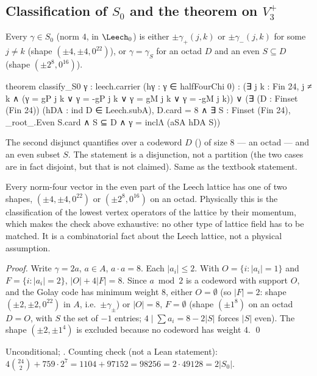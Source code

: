 \subsection{\texorpdfstring{Classification of $S_0$ and the theorem on $V_3^+$}{Classification of S0 and the theorem on V3+}}
\begin{theorem}\label{ch13:thm:classify}
Every $\gamma\in S_0$ (norm $4$, in $\Leech_0$) is either $\pm\gamma_+(j,k)$ or $\pm\gamma_-(j,k)$ for some $j\ne k$ (shape
$(\pm4,\pm4,0^{22})$), or $\gamma=\gamma_S$ for an octad $D$ and an even $S\subseteq D$ (shape $(\pm2^8,0^{16})$).
\end{theorem}
\begin{leancode}
theorem classify_S0 {γ : leech.carrier} (hγ : γ ∈ halfFourChi 0) :
    (∃ j k : Fin 24, j ≠ k ∧ (γ = gP j k ∨ γ = -gP j k ∨ γ = gM j k ∨ γ = -gM j k)) ∨
    (∃ (D : Finset (Fin 24)) (hDA : ind D ∈ Leech.subA), D.card = 8 ∧
      ∃ S : Finset (Fin 24), _root_.Even S.card ∧ S ⊆ D ∧ γ = inclΛ (aSA hDA S))
\end{leancode}
\begin{dictionary}
The second disjunct quantifies over a codeword $D$ () of size $8$ --- an octad
--- and an even subset $S$. The statement is a disjunction, not a partition (the two cases are in fact
disjoint, but that is not claimed). Same as the textbook statement.
\end{dictionary}
\begin{physics}
Every norm-four vector in the even part of the Leech lattice has one of two shapes, $(\pm4,\pm4,0^{22})$ or $(\pm2^8,0^{16})$ on an octad. Physically this is the classification of the lowest vertex operators of the lattice by their momentum, which makes the check above exhaustive: no other type of lattice field has to be matched. It is a combinatorial fact about the Leech lattice, not a physical assumption.
\end{physics}
\noindent\emph{Proof.} Write $\gamma=2a$, $a\in A$, $a\cdot a=8$. Each $|a_i|\le2$. With $O=\{i:|a_i|=1\}$ and
$F=\{i:|a_i|=2\}$, $|O|+4|F|=8$. Since $a\bmod2$ is a codeword with support $O$, and the Golay code has
minimum weight $8$, either $O=\emptyset$ (so $|F|=2$: shape $(\pm2,\pm2,0^{22})$ in $A$, i.e.\ $\pm\gamma_\pm$) or
$|O|=8$, $F=\emptyset$ (shape $(\pm1^8)$ on an octad $D=O$, with $S$ the set of $-1$ entries; $4\mid\sum a_i=8-2|S|$
forces $|S|$ even). The shape $(\pm2,\pm1^4)$ is excluded because no codeword has weight $4$. \qed
\begin{status}Unconditional; . Counting check (not a Lean statement):
$4\binom{24}{2}+759\cdot2^7=1104+97152=98256=2\cdot49128=2|S_0|$.\end{status}

